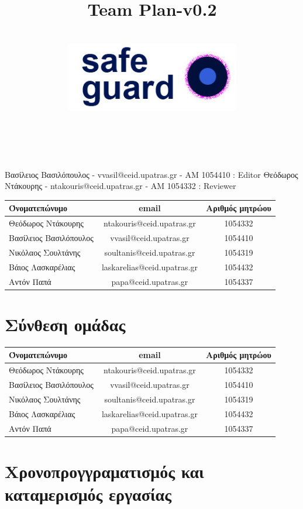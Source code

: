 \documentclass{article}
\title{Team Plan-v0.2}
\author{\\
\includegraphics[width=3in]{safeguard}\\[1ex]\\\\
}
\begin{document}
\maketitle

\newpage

Βασίλειος Βασιλόπουλος - vvasil@ceid.upatras.gr - ΑΜ 1054410 : Editor
Θεόδωρος Ντάκουρης - ntakouris@ceid.upatras.gr - ΑΜ 1054332 : Reviewer

\begin{tabular}{|l|c|c|}
\hline
Όνοματεπώνυμο & email & Αριθμός μητρώου  \\
\hline
Θεόδωρος Ντάκουρης & ntakouris@ceid.upatras.gr & 1054332 \\
Βασίλειος Βασιλόπουλος & vvasil@ceid.upatras.gr &  1054410\\
Νικόλαος Σουλτάνης & soultanis@ceid.upatras.gr & 1054319  \\
Βάιος Λασκαρέλιας & laskarelias@ceid.upatras.gr & 1054432 \\
Αντόν Παπά & papa@ceid.upatras.gr & 1054337 \\
\hline
\end{tabular}



\renewcommand{\contentsname}{Περιεχόμενα}
\tableofcontents


\section{Σύνθεση ομάδας}
\begin{tabular}{|l|c|c|}
\hline
Όνοματεπώνυμο & email & Αριθμός μητρώου  \\
\hline
Θεόδωρος Ντάκουρης & ntakouris@ceid.upatras.gr & 1054332 \\
Βασίλειος Βασιλόπουλος & vvasil@ceid.upatras.gr &  1054410\\
Νικόλαος Σουλτάνης & soultanis@ceid.upatras.gr & 1054319  \\
Βάιος Λασκαρέλιας & laskarelias@ceid.upatras.gr & 1054432 \\
Αντόν Παπά & papa@ceid.upatras.gr & 1054337 \\
\hline
\end{tabular}

\section{Χρονοπρογγραματισμός και καταμερισμός εργασίας}
\end{document}

